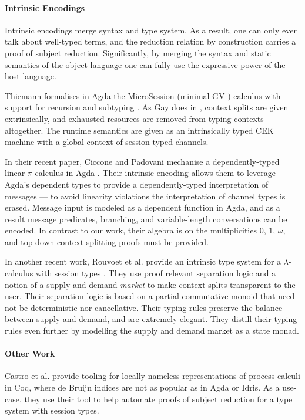 \documentclass[]{llncs}
\newcommand{\lambdacalc}{$\lambda$-calculus}
\newcommand{\picalc}{$\pi$-calculus}
\begin{document}
\paragraph*{Intrinsic Encodings}
 
Intrinsic encodings merge syntax and type system.
As a result, one can only ever talk about well-typed terms, and the reduction relation by construction carries a proof of subject reduction.
Significantly, by merging the syntax and static semantics of the object language one can fully use the expressive power of the host language.

Thiemann formalises in Agda the MicroSession (minimal GV \cite{Gay2010}) calculus with support for recursion and subtyping \cite{Thiemann2019}.
As Gay does in \cite{Gay2001}, context splits are given extrinsically, and exhausted resources are removed from typing contexts altogether.
The runtime semantics are given as an intrinsically typed CEK machine with a global context of session-typed channels.

In their recent paper, Ciccone and Padovani mechanise a dependently-typed linear \picalc{} in Agda \cite{Ciccone}.
Their intrinsic encoding allows them to leverage Agda's dependent types to provide a dependently-typed interpretation of messages --- to avoid linearity violations the interpretation of channel types is erased.
Message input is modeled as a dependent function in Agda, and as a result message predicates, branching, and variable-length conversations can be encoded.
In contrast to our work, their algebra is on the multiplicities $0$, $1$, $\omega$, and top-down context splitting proofs must be provided.

In another recent work, Rouvoet et al. provide an intrinsic type system for a \lambdacalc{} with session types \cite{Rouvoet2020}.
They use proof relevant separation logic and a notion of a supply and demand \emph{market} to make context splits transparent to the user.
Their separation logic is based on a partial commutative monoid that need not be deterministic nor cancellative.
Their typing rules preserve the balance between supply and demand, and are extremely elegant.
They distill their typing rules even further by modelling the supply and demand market as a state monad.

\paragraph*{Other Work}

Castro et al. \cite{Castro2020} provide tooling for locally-nameless representations of process calculi in Coq, where de Bruijn indices are not as popular as in Agda or Idris.
As a use-case, they use their tool to help automate proofs of subject reduction for a type system with session types.
\end{document}
